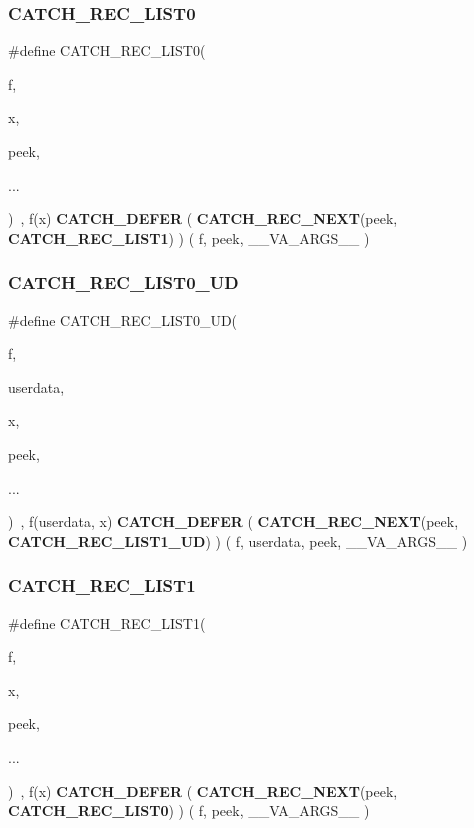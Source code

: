 \subsubsection{CATCH\_REC\_LIST0}
{\footnotesize\ttfamily \#define C\+A\+T\+C\+H\+\_\+\+R\+E\+C\+\_\+\+L\+I\+S\+T0(\begin{DoxyParamCaption}\item[{}]{f,  }\item[{}]{x,  }\item[{}]{peek,  }\item[{}]{... }\end{DoxyParamCaption})~, f(x) \textbf{ C\+A\+T\+C\+H\+\_\+\+D\+E\+F\+ER} ( \textbf{ C\+A\+T\+C\+H\+\_\+\+R\+E\+C\+\_\+\+N\+E\+XT}(peek, \textbf{ C\+A\+T\+C\+H\+\_\+\+R\+E\+C\+\_\+\+L\+I\+S\+T1}) ) ( f, peek, \+\_\+\+\_\+\+V\+A\+\_\+\+A\+R\+G\+S\+\_\+\+\_\+ )}

\mbox{\label{catch_8hpp_aea894953d28c5ed83e59ce6c74d0a665}} 
\subsubsection{CATCH\_REC\_LIST0\_UD}
{\footnotesize\ttfamily \#define C\+A\+T\+C\+H\+\_\+\+R\+E\+C\+\_\+\+L\+I\+S\+T0\+\_\+\+UD(\begin{DoxyParamCaption}\item[{}]{f,  }\item[{}]{userdata,  }\item[{}]{x,  }\item[{}]{peek,  }\item[{}]{... }\end{DoxyParamCaption})~, f(userdata, x) \textbf{ C\+A\+T\+C\+H\+\_\+\+D\+E\+F\+ER} ( \textbf{ C\+A\+T\+C\+H\+\_\+\+R\+E\+C\+\_\+\+N\+E\+XT}(peek, \textbf{ C\+A\+T\+C\+H\+\_\+\+R\+E\+C\+\_\+\+L\+I\+S\+T1\+\_\+\+UD}) ) ( f, userdata, peek, \+\_\+\+\_\+\+V\+A\+\_\+\+A\+R\+G\+S\+\_\+\+\_\+ )}

\mbox{\label{catch_8hpp_abedd1ae08e12478704233e9bf29e0fe9}} 
\subsubsection{CATCH\_REC\_LIST1}
{\footnotesize\ttfamily \#define C\+A\+T\+C\+H\+\_\+\+R\+E\+C\+\_\+\+L\+I\+S\+T1(\begin{DoxyParamCaption}\item[{}]{f,  }\item[{}]{x,  }\item[{}]{peek,  }\item[{}]{... }\end{DoxyParamCaption})~, f(x) \textbf{ C\+A\+T\+C\+H\+\_\+\+D\+E\+F\+ER} ( \textbf{ C\+A\+T\+C\+H\+\_\+\+R\+E\+C\+\_\+\+N\+E\+XT}(peek, \textbf{ C\+A\+T\+C\+H\+\_\+\+R\+E\+C\+\_\+\+L\+I\+S\+T0}) ) ( f, peek, \+\_\+\+\_\+\+V\+A\+\_\+\+A\+R\+G\+S\+\_\+\+\_\+ )}

